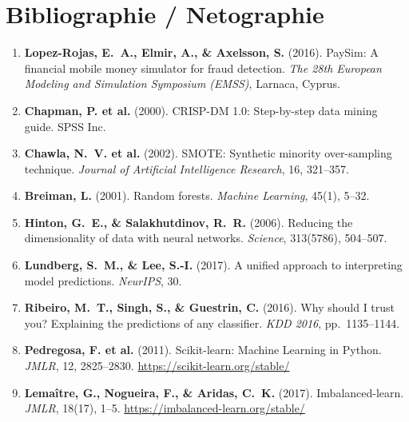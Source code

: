 \documentclass[12pt,a4paper,twoside]{report}
\begin{document}
\chapter*{Bibliographie / Netographie}

\begin{enumerate}

  \item \textbf{Lopez-Rojas, E.~A., Elmir, A., \& Axelsson, S.} (2016). PaySim: A
    financial mobile money simulator for fraud detection. \textit{The 28th European
    Modeling and Simulation Symposium (EMSS)}, Larnaca, Cyprus.

  \item \textbf{Chapman, P. et al.} (2000). CRISP-DM 1.0: Step-by-step data mining guide.
    SPSS Inc.

  \item \textbf{Chawla, N.~V. et al.} (2002). SMOTE: Synthetic minority over-sampling
    technique. \textit{Journal of Artificial Intelligence Research}, 16, 321--357.

  \item \textbf{Breiman, L.} (2001). Random forests. \textit{Machine Learning}, 45(1),
    5--32.

  \item \textbf{Hinton, G.~E., \& Salakhutdinov, R.~R.} (2006). Reducing the
    dimensionality of data with neural networks. \textit{Science}, 313(5786), 504--507.

  \item \textbf{Lundberg, S.~M., \& Lee, S.-I.} (2017). A unified approach to interpreting
    model predictions. \textit{NeurIPS}, 30.

  \item \textbf{Ribeiro, M.~T., Singh, S., \& Guestrin, C.} (2016). Why should I trust
    you? Explaining the predictions of any classifier. \textit{KDD 2016}, pp.~1135--1144.

  \item \textbf{Pedregosa, F. et al.} (2011). Scikit-learn: Machine Learning in Python.
    \textit{JMLR}, 12, 2825--2830. \url{https://scikit-learn.org/stable/}

  \item \textbf{Lemaître, G., Nogueira, F., \& Aridas, C.~K.} (2017). Imbalanced-learn.
    \textit{JMLR}, 18(17), 1--5. \url{https://imbalanced-learn.org/stable/}


\end{enumerate}
\end{document}
